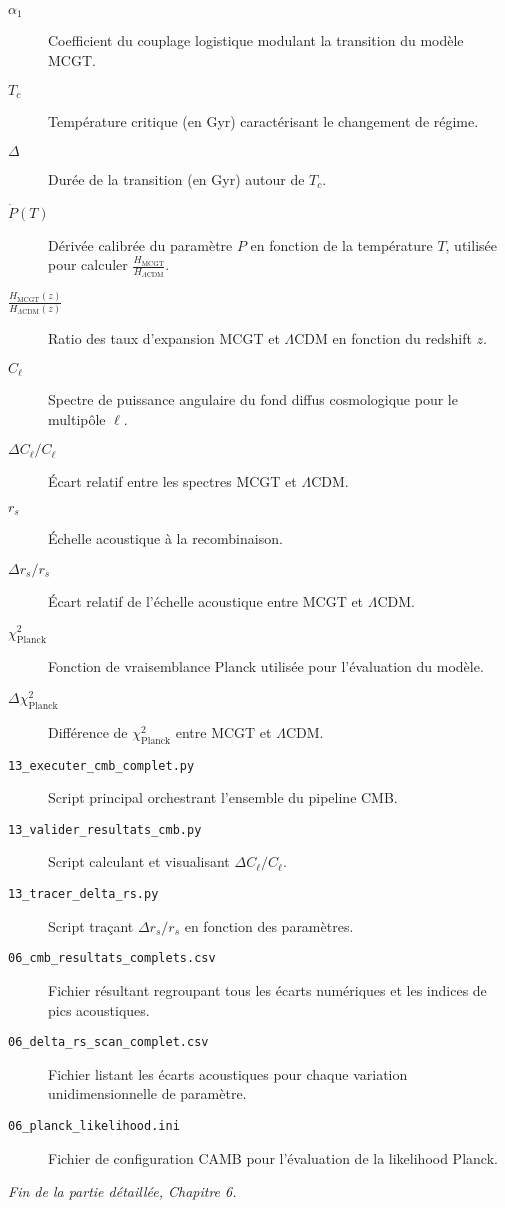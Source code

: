 \begin{description}
  \item[\(\alpha_{1}\)] Coefficient du couplage logistique modulant la transition du modèle MCGT.
  \item[\(T_{c}\)] Température critique (en Gyr) caractérisant le changement de régime.
  \item[\(\Delta\)] Durée de la transition (en Gyr) autour de \(T_{c}\).
  \item[\(\dot P(T)\)] Dérivée calibrée du paramètre \(P\) en fonction de la température \(T\), utilisée pour calculer \(\frac{H_{\mathrm{MCGT}}}{H_{\Lambda\mathrm{CDM}}}\).
  \item[\(\tfrac{H_{\mathrm{MCGT}}(z)}{H_{\Lambda\mathrm{CDM}}(z)}\)] Ratio des taux d’expansion MCGT et \(\Lambda\)CDM en fonction du redshift \(z\).
  \item[\(C_{\ell}\)] Spectre de puissance angulaire du fond diffus cosmologique pour le multipôle \(\ell\).
  \item[\(\Delta C_{\ell}/C_{\ell}\)] Écart relatif entre les spectres MCGT et \(\Lambda\)CDM.
  \item[\(r_{s}\)] Échelle acoustique à la recombinaison.
  \item[\(\Delta r_{s}/r_{s}\)] Écart relatif de l’échelle acoustique entre MCGT et \(\Lambda\)CDM.
  \item[\(\chi^{2}_{\mathrm{Planck}}\)] Fonction de vraisemblance Planck utilisée pour l’évaluation du modèle.
  \item[\(\Delta\chi^{2}_{\mathrm{Planck}}\)] Différence de \(\chi^{2}_{\mathrm{Planck}}\) entre MCGT et \(\Lambda\)CDM.
  \item[\texttt{13\_executer\_cmb\_complet.py}] Script principal orchestrant l’ensemble du pipeline CMB.
  \item[\texttt{13\_valider\_resultats\_cmb.py}] Script calculant et visualisant \(\Delta C_{\ell}/C_{\ell}\).
  \item[\texttt{13\_tracer\_delta\_rs.py}] Script traçant \(\Delta r_{s}/r_{s}\) en fonction des paramètres.
  \item[\texttt{06\_cmb\_resultats\_complets.csv}] Fichier résultant regroupant tous les écarts numériques et les indices de pics acoustiques.
  \item[\texttt{06\_delta\_rs\_scan\_complet.csv}] Fichier listant les écarts acoustiques pour chaque variation unidimensionnelle de paramètre.
  \item[\texttt{06\_planck\_likelihood.ini}] Fichier de configuration CAMB pour l’évaluation de la likelihood Planck.
\end{description}

\bigskip
\noindent\emph{Fin de la partie détaillée, Chapitre 6.}
